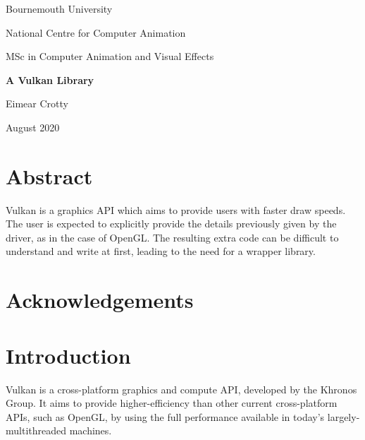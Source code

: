 \documentclass[12pt]{report}
\theoremstyle{definition}
\begin{document}
  \renewcommand{\familydefault}{\sfdefault}
  \selectfont

  \begin{titlepage}
    \centering
    {\Huge Bournemouth University\par}
    \vspace{1cm}
    {\Large National Centre for Computer Animation\par}
    \vspace{1cm}
    {\Large MSc in Computer Animation and Visual Effects\par}
    \vspace{4cm}
    {\huge\bfseries A Vulkan Library\par}
    \vspace{1.5cm}
    {\Large Eimear Crotty\par}
    \vfill
    {\Large August 2020}
  \end{titlepage}

  \chapter*{Abstract}
    Vulkan is a graphics API which aims to provide users with faster draw speeds.
    The user is expected to explicitly provide the details previously given by
    the driver, as in the case of OpenGL. The resulting extra code can be
    difficult to understand and write at first, leading to the need for a 
    wrapper library.

  \chapter*{Acknowledgements}

    \vspace{1cm}

  \tableofcontents

  \chapter{Introduction}
    Vulkan is a cross-platform graphics and compute API, developed by the Khronos Group. It aims to provide
    higher-efficiency than other current cross-platform APIs, such as OpenGL, by using the full performance
    available in today's largely-multithreaded machines.
\end{document}
